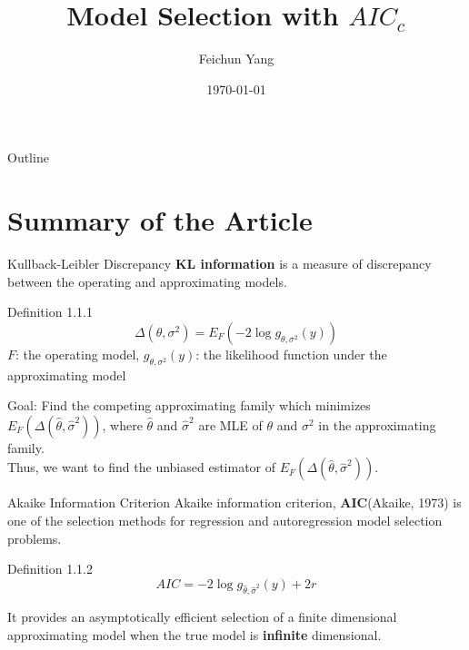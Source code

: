 \documentclass[11pt]{beamer}
\author{Feichun Yang}
\title{Model Selection with $AIC_c$}
\institute[]{SYRACUSE UNIVERSITY}
\date{\today}
\begin{document}
\begin{frame}
\titlepage
\end{frame}

\begin{frame}{Outline}
\tableofcontents 
\end{frame}

\section{Summary of the Article}

\begin{frame}{Kullback-Leibler Discrepancy}
    \textbf{KL information} is a measure of discrepancy between the operating and approximating models.
     \begin{block}{Definition 1.1.1}
        \begin{equation}
        \Delta (\theta, \sigma^2) = E_F(-2\log g_{\theta, \sigma^2}(y))
        \end{equation}
        $F$: the operating model, $g_{\theta, \sigma^2}(y)$: the likelihood function under the approximating model
    \end{block}
    Goal: Find the competing approximating family which minimizes $E_F(\Delta (\hat{\theta}, \hat{\sigma}^2))$, where $\hat{\theta}$ and $\hat{\sigma}^2$ are MLE of $\theta$ and $\sigma^2$ in the approximating family.\\  
    Thus, we want to find the unbiased estimator of $E_F(\Delta (\hat{\theta}, \hat{\sigma}^2))$.\cite{hurvich1989regression}
\end{frame}

\begin{frame}{Akaike Information Criterion}
     Akaike information criterion, \textbf{AIC}(Akaike, 1973) is one of the selection methods for regression and autoregression model selection problems.\cite{seber2012linear}
     \begin{block}{Definition 1.1.2}
        \begin{equation}
        \label{}
        AIC = -2\log g_{\hat{\theta}, \hat{\sigma}^2}(y) + 2r
        \end{equation}
    \end{block}
     It provides an asymptotically efficient selection of a finite dimensional approximating model when the true model is \textbf{infinite} dimensional.
        
\end{frame}
\end{document}
